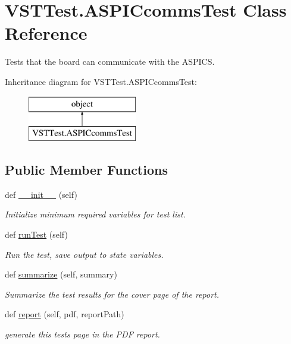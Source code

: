 \hypertarget{class_v_s_t_test_1_1_a_s_p_i_ccomms_test}{}\section{V\+S\+T\+Test.\+A\+S\+P\+I\+Ccomms\+Test Class Reference}
\label{class_v_s_t_test_1_1_a_s_p_i_ccomms_test}


Tests that the board can communicate with the A\+S\+P\+I\+CS.  


Inheritance diagram for V\+S\+T\+Test.\+A\+S\+P\+I\+Ccomms\+Test\+:\begin{figure}[H]
\begin{center}
\leavevmode
\includegraphics[height=2.000000cm]{class_v_s_t_test_1_1_a_s_p_i_ccomms_test}
\end{center}
\end{figure}
\subsection*{Public Member Functions}
\begin{DoxyCompactItemize}
\item 
def \hyperlink{class_v_s_t_test_1_1_a_s_p_i_ccomms_test_a69362dea820d5e167543f4ea1fb86a08}{\+\_\+\+\_\+init\+\_\+\+\_\+} (self)
\begin{DoxyCompactList}\small\item\em Initialize minimum required variables for test list. \end{DoxyCompactList}\item 
def \hyperlink{class_v_s_t_test_1_1_a_s_p_i_ccomms_test_af7140cb7fcc2a61ab7b0c2c080f78cb8}{run\+Test} (self)
\begin{DoxyCompactList}\small\item\em Run the test, save output to state variables. \end{DoxyCompactList}\item 
def \hyperlink{class_v_s_t_test_1_1_a_s_p_i_ccomms_test_a1c8a9a15b609498fba74d34c1250f8dd}{summarize} (self, summary)
\begin{DoxyCompactList}\small\item\em Summarize the test results for the cover page of the report. \end{DoxyCompactList}\item 
def \hyperlink{class_v_s_t_test_1_1_a_s_p_i_ccomms_test_ab0d44b669fffb02c1a1159ad28f857f8}{report} (self, pdf, report\+Path)
\begin{DoxyCompactList}\small\item\em generate this test\textquotesingle{}s page in the P\+DF report. \end{DoxyCompactList}\end{DoxyCompactItemize}


